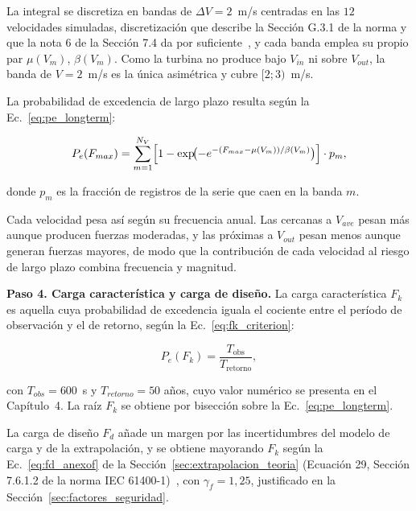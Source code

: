 La integral se discretiza en bandas de $\Delta V = 2$~m/s centradas en las $12$ velocidades simuladas, discretización que describe la Sección G.3.1 de la norma y que la nota 6 de la Sección 7.4 da por suficiente~\parencite{IEC61400-1}, y cada banda emplea su propio par $\mu(V_m)$, $\beta(V_m)$. Como la turbina no produce bajo $V_{in}$ ni sobre $V_{out}$, la banda de $V = 2$~m/s es la única asimétrica y cubre $[2; 3)$~m/s.

La probabilidad de excedencia de largo plazo resulta según la Ec.~\ref{eq:pe_longterm}:

\begin{equation}
    P_e(F_{max}) = \sum_{m=1}^{N_V} \Bigl[1 - \exp\!\bigl(-e^{-(F_{max} - \mu(V_m))/\beta(V_m)}\bigr)\Bigr] \cdot p_m,
    \label{eq:pe_longterm}
\end{equation}

donde $p_m$ es la fracción de registros de la serie que caen en la banda $m$.

Cada velocidad pesa así según su frecuencia anual. Las cercanas a $V_{ave}$ pesan más aunque producen fuerzas moderadas, y las próximas a $V_{out}$ pesan menos aunque generan fuerzas mayores, de modo que la contribución de cada velocidad al riesgo de largo plazo combina frecuencia y magnitud.

\medskip
\noindent\textbf{Paso 4. Carga característica y carga de diseño.}
La carga característica $F_k$ es aquella cuya probabilidad de excedencia iguala el cociente entre el período de observación y el de retorno, según la Ec.~\ref{eq:fk_criterion}:

\begin{equation}
    P_e(F_k) = \frac{T_{\text{obs}}}{T_{\text{retorno}}},
    \label{eq:fk_criterion}
\end{equation}

con $T_{obs} = 600$~s y $T_{retorno} = 50$ años, cuyo valor numérico se presenta en el Capítulo~4. La raíz $F_k$ se obtiene por bisección sobre la Ec.~\ref{eq:pe_longterm}.

La carga de diseño $F_d$ añade un margen por las incertidumbres del modelo de carga y de la extrapolación, y se obtiene mayorando $F_k$ según la Ec.~\ref{eq:fd_anexof} de la Sección~\ref{sec:extrapolacion_teoria} (Ecuación 29, Sección 7.6.1.2 de la norma IEC 61400-1)~\parencite*{IEC61400-1}, con $\gamma_f = 1{,}25$, justificado en la Sección~\ref{sec:factores_seguridad}.

